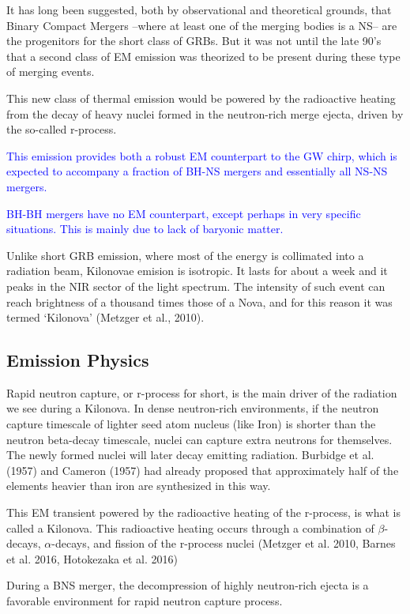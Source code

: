 It has long been suggested, both by observational and theoretical grounds, that Binary Compact Mergers --where at least one of the merging bodies is a NS-- are the progenitors for the short class of GRBs. But it was not until the late 90's that a second class of EM emission was theorized to be present during these type of merging events.

This new class of thermal emission would be powered by the radioactive heating from the decay of heavy nuclei formed in the neutron-rich merge ejecta, driven by the so-called r-process.

\textcolor{blue}{This emission provides both a robust EM counterpart to the GW chirp, which is expected to accompany a fraction of BH-NS mergers and essentially all NS-NS mergers.}

\textcolor{blue}{BH-BH mergers have no EM counterpart, except perhaps in very specific situations. This is mainly due to lack of baryonic matter.}

Unlike short GRB emission, where most of the energy is collimated into a radiation beam, Kilonovae emision is isotropic.
It lasts for about a week and it peaks in the NIR sector of the light spectrum. The intensity of such event can reach brightness of a thousand times those of a Nova, and for this reason it was termed `Kilonova' (Metzger et al., 2010).

\subsection{Emission Physics}

Rapid neutron capture, or r-process for short, is the main driver of the radiation we see during a Kilonova.
In dense neutron-rich environments, if the neutron capture timescale of lighter seed atom nucleus (like Iron) is shorter than the neutron beta-decay timescale, nuclei can capture extra neutrons for themselves.
The newly formed nuclei will later decay emitting radiation.
Burbidge et al. (1957) and Cameron (1957) had already proposed that approximately half of the elements heavier than iron are synthesized in this way.

This EM transient powered by the radioactive heating of the r-process, is what is called a Kilonova.
This radioactive heating occurs through a combination of $\beta$-decays, $\alpha$-decays, and fission of the r-process nuclei (Metzger et al. 2010, Barnes et al. 2016, Hotokezaka et al. 2016)

During a BNS merger, the decompression of highly neutron-rich ejecta is a favorable environment for rapid neutron capture process.

